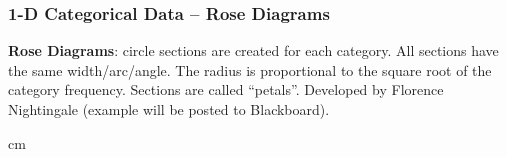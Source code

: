 \documentclass{beamer} %
\begin{document}
\begin{frame}\frametitle{1-D Categorical Data -- Rose Diagrams}
	\small
	
	\textbf{Rose Diagrams}:  circle sections are created for each category.  All sections have the same width/arc/angle.  The radius is proportional to the square root of the category frequency.  Sections are called ``petals''.  Developed by Florence Nightingale (example will be posted to Blackboard).
	
	
	 cm
	
\end{frame}
\end{document}
